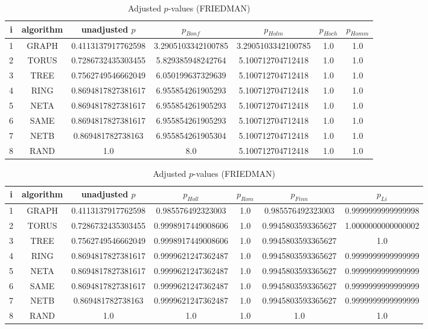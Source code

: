 \documentclass[a4paper,10pt]{article}
\begin{document}
\begin{landscape}
\begin{table}[!htp]
\centering\scriptsize
\caption{Adjusted $p$-values (FRIEDMAN)}
\begin{tabular}{ccccccc}
i&algorithm&unadjusted $p$&$p_{Bonf}$&$p_{Holm}$&$p_{Hoch}$&$p_{Homm}$\\
\hline
1& GRAPH&0.4113137917762598&3.2905103342100785&3.2905103342100785&1.0&1.0\\
2& TORUS&0.7286732435303455&5.829385948242764&5.100712704712418&1.0&1.0\\
3& TREE&0.7562749546662049&6.050199637329639&5.100712704712418&1.0&1.0\\
4& RING&0.8694817827381617&6.955854261905293&5.100712704712418&1.0&1.0\\
5& NETA&0.8694817827381617&6.955854261905293&5.100712704712418&1.0&1.0\\
6& SAME&0.8694817827381617&6.955854261905293&5.100712704712418&1.0&1.0\\
7& NETB&0.869481782738163&6.955854261905304&5.100712704712418&1.0&1.0\\
8& RAND&1.0&8.0&5.100712704712418&1.0&1.0\\
\hline
\end{tabular}
\end{table}

\begin{table}[!htp]
\centering\scriptsize
\caption{Adjusted $p$-values (FRIEDMAN)}
\begin{tabular}{ccccccc}
i&algorithm&unadjusted $p$&$p_{Holl}$&$p_{Rom}$&$p_{Finn}$&$p_{Li}$\\
\hline
1& GRAPH&0.4113137917762598&0.985576492323003&1.0&0.985576492323003&0.9999999999999998\\
2& TORUS&0.7286732435303455&0.9998917449008606&1.0&0.9945803593365627&1.0000000000000002\\
3& TREE&0.7562749546662049&0.9998917449008606&1.0&0.9945803593365627&1.0\\
4& RING&0.8694817827381617&0.9999621247362487&1.0&0.9945803593365627&0.9999999999999999\\
5& NETA&0.8694817827381617&0.9999621247362487&1.0&0.9945803593365627&0.9999999999999999\\
6& SAME&0.8694817827381617&0.9999621247362487&1.0&0.9945803593365627&0.9999999999999999\\
7& NETB&0.869481782738163&0.9999621247362487&1.0&0.9945803593365627&0.9999999999999999\\
8& RAND&1.0&1.0&1.0&1.0&1.0\\
\hline
\end{tabular}
\end{table}



\end{landscape}
\end{document}
